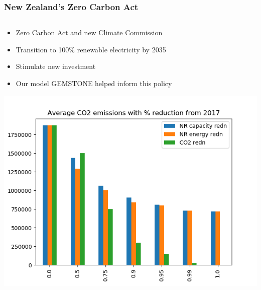 \documentclass[xcolor=dvipsnames]{beamer}
\begin{document}
\begin{frame}
  \frametitle{New Zealand's Zero Carbon Act}

  \begin{columns}[T]
    \begin{column}{0.45\linewidth}
      \begin{itemize}
      \item Zero Carbon Act and new Climate Commission
      \item Transition to 100\% renewable electricity by 2035
      \item Stimulate new investment
      \item \alert{Our model GEMSTONE helped inform this policy}
      \end{itemize}


      \includegraphics[width=\textwidth]{includes/TotalCarbonv20.png}
      \\
    \end{column}


\end{columns}
\end{frame}
\end{document}
